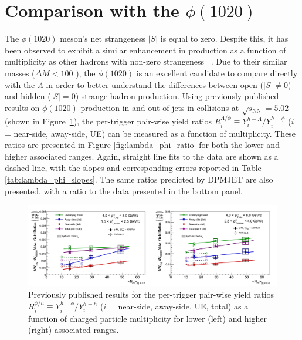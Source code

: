 \section{Comparison with the $\phi(1020)$}
\label{sec:phi_comparison}

The $\phi(1020)$ meson's net strangeness $|S|$ is equal to zero. Despite this, it has been observed to exhibit a similar enhancement in production as a function of multiplicity as other hadrons with non-zero strangeness ~\cite{PhiEnhancement}. Due to their similar masses ($\Delta M < 100$ \MeVmass), the $\phi(1020)$ is an excellent candidate to compare directly with the $\Lambda$ in order to better understand the differences between open ($|S| \neq 0$) and hidden ($|S| = 0$) strange hadron production. Using previously published results on $\phi(1020)$ production in and out-of jets in \pPb collisions at $\sqrt{s_{\text{NN}}} = 5.02$ \TeV ~\cite{JustinPaper} (shown in Figure~\ref{fig:justin_plots}), the per-trigger pair-wise yield ratios $R_{i}^{\Lambda/\phi} \equiv Y_{i}^{h-\Lambda}/Y_{i}^{h-\phi}$ ($i$ = near-side, away-side, UE) can be measured as a function of multiplicity. These ratios are presented in Figure \ref{fig:lambda_phi_ratio} for both the lower and higher associated \pt ranges. Again, straight line fits to the data are shown as a dashed line, with the slopes and corresponding errors reported in Table \ref{tab:lambda_phi_slopes}. The same ratios predicted by DPMJET are also presented, with a ratio to the data presented in the bottom panel.

\begin{figure}
\centering
\includegraphics[width=\textwidth]{figures/results/justin_plots.png}
\caption{Previously published results for the per-trigger pair-wise yield ratios $R_{i}^{\phi/h} \equiv Y_{i}^{h-\phi}/Y_{i}^{h-h}$ ($i$ = near-side, away-side, UE, total) as a function of charged particle multiplicity for lower (left) and higher (right) associated \pt ranges.}
\label{fig:justin_plots}
\end{figure}

